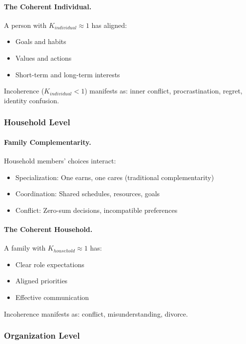 \documentclass[12pt,a4paper]{article}
\begin{document}
\paragraph{The Coherent Individual.}
A person with $K_{individual} \approx 1$ has aligned:
\begin{itemize}
  \item Goals and habits
  \item Values and actions
  \item Short-term and long-term interests
\end{itemize}

Incoherence ($K_{individual} < 1$) manifests as:
inner conflict, procrastination, regret, identity confusion.

\subsubsection{Household Level}

\paragraph{Family Complementarity.}
Household members' choices interact:
\begin{itemize}
  \item Specialization: One earns, one cares (traditional complementarity)
  \item Coordination: Shared schedules, resources, goals
  \item Conflict: Zero-sum decisions, incompatible preferences
\end{itemize}

\paragraph{The Coherent Household.}
A family with $K_{household} \approx 1$ has:
\begin{itemize}
  \item Clear role expectations
  \item Aligned priorities
  \item Effective communication
\end{itemize}

Incoherence manifests as: conflict, misunderstanding, divorce.

\subsubsection{Organization Level}
\end{document}
